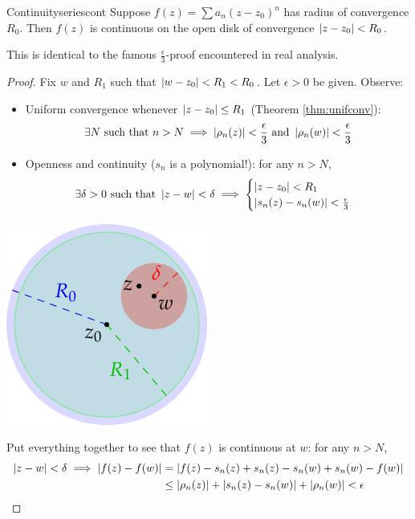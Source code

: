 \goodbreak

\begin{thm}{Continuity}{seriescont}
	Suppose $f(z)=\sum a_n(z-z_0)^n$ has radius of convergence $R_0$. Then $f(z)$ is continuous on the open disk of convergence $\left| z-z_0\right|<R_0$.
\end{thm}

This is identical to the famous $\frac\epsilon 3$-proof encountered in real analysis.

\begin{proof}
	Fix $w$ and $R_1$ such that $\left| w-z_0\right|<R_1<R_0$. Let $\epsilon>0$ be given. Observe:\par
	\begin{minipage}[t]{0.7\linewidth}\vspace{0pt}
		\begin{itemize}\itemsep0pt
			\item Uniform convergence whenever $\left| z-z_0\right|\le R_1$ (Theorem \ref{thm:unifconv}):
			\[
				\exists N\text{ such that }n>N\implies \left| \rho_n(z)\right|<\frac\epsilon 3\text{ and }\left| \rho_n(w)\right|<\frac\epsilon 3
			\]
		  \item Openness and continuity ($s_n$ is a polynomial!): for any $n>N$,
		  \[
		  	\exists\delta>0\text{ such that } \left| z-w\right|<\delta\implies
		  	\begin{cases}
		  		\left| z-z_0\right|<R_1\\
					\left| s_n(z)-s_n(w)\right|<\frac\epsilon 3
		  	\end{cases}
		  \]
		\end{itemize}
	\end{minipage}
	\hfill
	\begin{minipage}[t]{0.29\linewidth}\vspace{-6pt}
		\flushright\includegraphics[scale=0.95]{cont}
	\end{minipage}\medbreak
	Put everything together to see that $f(z)$ is continuous at $w$: for any $n>N$,
	\begin{align*}
		\left| z-w\right|<\delta\implies \left| f(z)-f(w)\right|
			&=\left| f(z)-s_n(z)+s_n(z)-s_n(w)+s_n(w)-f(w)\right|\\
			&\le \left| \rho_n(z)\right|+\left| s_n(z)-s_n(w)\right|+\left| \rho_n(w)\right|
			<\epsilon
			\tag*{\qedhere}
	\end{align*}
\end{proof}

